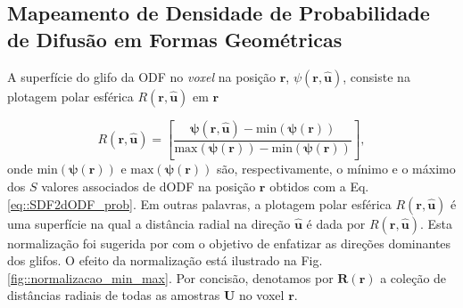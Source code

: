 \documentclass[
    12pt,                %
    oneside,            %
    a4paper,            %
    english,            %
    french,                %
    spanish,            %
    brazil                %
    ]{abntex2}
\begin{document}
\subsection{Mapeamento de Densidade de Probabilidade de Difusão em Formas Geométricas}
\label{sec::glifos_odf}


A superfície do glifo da ODF no \textit{voxel} na posição $\mathbf{r}$, $\psi(\mathbf{r}, \mathbf{\hat{u}})$, consiste na plotagem polar esférica $R(\mathbf{r} , \mathbf{\hat{u}})$ em $\mathbf{r}$

\begin{equation}
\label{eq::dODF2min_max}
    R(\mathbf{r} , \mathbf{\hat{u}}) = [ \frac{\boldsymbol{\psi}(\mathbf{r}, \mathbf{\hat{u}}) - \text{min}(\boldsymbol{\psi}(\mathbf{r}))}{\text{max}(\boldsymbol{\psi}(\mathbf{r})) - \text{min}(\boldsymbol{\psi}(\mathbf{r}))}],
\end{equation}
onde $\text{min}(\boldsymbol{\psi}(\mathbf{r}))$ e $\text{max}(\boldsymbol{\psi}(\mathbf{r}))$ são, respectivamente, o mínimo e o máximo dos $S$ valores associados de dODF na posição $\mathbf{r}$ obtidos com a Eq. \ref{eq::SDF2dODF_prob}. Em outras palavras, a plotagem polar esférica $R(\mathbf{r} , \mathbf{\hat{u}})$ é uma superfície na qual a distância radial na direção $\mathbf{\hat{u}}$ é dada por $R(\mathbf{r} , \mathbf{\hat{u}})$. Esta normalização foi sugerida por  com o objetivo de enfatizar as direções dominantes dos glifos.
O efeito da normalização está ilustrado na Fig. \ref{fig::normalizacao_min_max}. Por concisão, denotamos por $\boldsymbol{R}(\mathbf{r})$ a coleção de distâncias radiais de todas as amostras $\mathbf{U}$ no voxel $\mathbf{r}$.


\end{document}
